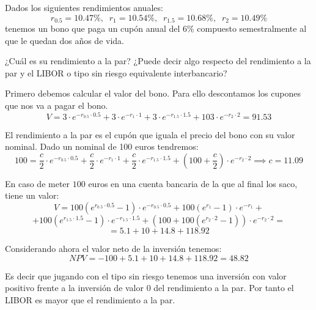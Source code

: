 \begin{problem}[11]
Dados los siguientes rendimientos anuales:
\[r_{0.5} = 10.47\%, \;\; r_1 = 10.54\%, \;\; r_{1.5}=10.68\%, \;\; r_{2}=10.49\%\]
tenemos un bono que paga un cupón anual del 6\% compuesto semestralmente al que le quedan dos años de vida.

\ppart ¿Cuál es su rendimiento a la par?
\ppart ¿Puede decir algo respecto del rendimiento a la par y el LIBOR o tipo sin riesgo equivalente interbancario?
\solution
\spart

Primero debemos calcular el valor del bono. Para ello descontamos los cupones que nos va a pagar el bono.
\[V = 3\cdot e^{-r_{0.5}\cdot 0.5} + 3\cdot e ^{-r_1\cdot 1} + 3\cdot e^{-r_{1.5}\cdot 1.5} + 103 \cdot e^{-r_2\cdot 2} = 91.53\]

El rendimiento a la par es el cupón que iguala el precio del bono con su valor nominal. Dado un nominal de 100 euros tendremos:
\[100 = \frac{c}{2}\cdot e^{-r_{0.5}\cdot 0.5} + \frac{c}{2}\cdot e ^{-r_1\cdot 1} + \frac{c}{2}\cdot e^{-r_{1.5}\cdot 1.5} + \left(100+\frac{c}{2}\right) \cdot e^{-r_2\cdot 2} \implies c=11.09\]

\spart
{}

En caso de meter $100$ euros en una cuenta bancaria de la que al final los saco, tiene un valor:
\[V = 100\left(e^{r_{0.5}\cdot 0.5}-1\right)\cdot e^{-r_{0.5}\cdot 0.5} + 100\left(e^{r_{1}}-1\right)\cdot e ^{-r_1} + \]
\[ +100\left(e^{r_{1.5}\cdot 1.5}-1\right)\cdot e^{-r_{1.5}\cdot 1.5} + (100+100\left(e^{r_2\cdot 2}-1\right)) \cdot e^{-r_2\cdot 2}=\]
\[=5.1 + 10 + 14.8 + 118.92\]

Considerando ahora el valor neto de la inversión tenemos:
\[NPV = -100 + 5.1 + 10 +14.8+118.92 = 48.82\]

Es decir que jugando con el tipo sin riesgo tenemos una inversión con valor positivo frente a la inversión de valor 0 del rendimiento a la par. Por tanto el LIBOR es mayor que el rendimiento a la par.

\end{problem}


